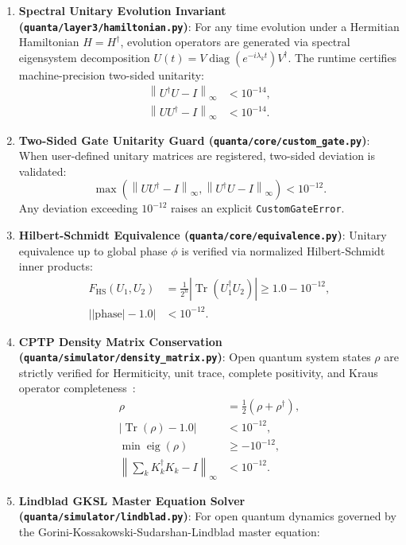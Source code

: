 \documentclass[aps,prx,twocolumn,superscriptaddress,nofootinbib]{revtex4-2}
\newcommand{\norm}[1]{\left\|#1\right\|}
\newcommand{\Tr}{\operatorname{Tr}}
\newcommand{\diag}{\operatorname{diag}}
\begin{document}
\begin{enumerate}
    \item \textbf{Spectral Unitary Evolution Invariant (\texttt{quanta/layer3/hamiltonian.py})}: For any time evolution under a Hermitian Hamiltonian $H = H^\dagger$, evolution operators are generated via spectral eigensystem decomposition $U(t) = V \diag(e^{-i \lambda_k t}) V^\dagger$. The runtime certifies machine-precision two-sided unitarity:
    \begin{align}
        \norm{U^\dagger U - I}_\infty &< 10^{-14}, \\
        \norm{U U^\dagger - I}_\infty &< 10^{-14}.
    \end{align}
    \item \textbf{Two-Sided Gate Unitarity Guard (\texttt{quanta/core/custom_gate.py})}: When user-defined unitary matrices are registered, two-sided deviation is validated:
    \begin{equation}
        \max\left( \norm{U U^\dagger - I}_\infty, \norm{U^\dagger U - I}_\infty \right) < 10^{-12}.
    \end{equation}
    Any deviation exceeding $10^{-12}$ raises an explicit \texttt{CustomGateError}.
    \item \textbf{Hilbert-Schmidt Equivalence (\texttt{quanta/core/equivalence.py})}: Unitary equivalence up to global phase $\phi$ is verified via normalized Hilbert-Schmidt inner products:
    \begin{align}
        F_{\text{HS}}(U_1, U_2) &= \frac{1}{2^n} \left| \Tr(U_1^\dagger U_2) \right| \ge 1.0 - 10^{-12}, \\
        \left| |\text{phase}| - 1.0 \right| &< 10^{-12}.
    \end{align}
    \item \textbf{CPTP Density Matrix Conservation (\texttt{quanta/simulator/density_matrix.py})}: Open quantum system states $\rho$ are strictly verified for Hermiticity, unit trace, complete positivity, and Kraus operator completeness~\cite{lindblad1976generators,gorini1976completely}:
    \begin{align}
        \rho &= \frac{1}{2}(\rho + \rho^\dagger), \\
        |\Tr(\rho) - 1.0| &< 10^{-12}, \\
        \min \operatorname{eig}(\rho) &\ge -10^{-12}, \\
        \norm{\sum_k K_k^\dagger K_k - I}_\infty &< 10^{-12}.
    \end{align}
    \item \textbf{Lindblad GKSL Master Equation Solver (\texttt{quanta/simulator/lindblad.py})}: For open quantum dynamics governed by the Gorini-Kossakowski-Sudarshan-Lindblad master equation:

\end{enumerate}
\end{document}
